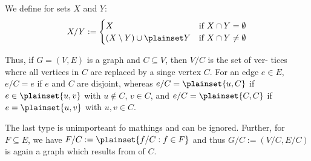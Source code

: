 We define for sets $X$ and $Y$: \[
	X/Y:= 
		\begin{cases}
			X & \text{if } X \cap Y=\emptyset \\
			(X\setminus Y) \cup \plainset Y & \text{if } X \cap Y \neq \emptyset
		\end{cases}
\]

Thus, if $G=(V,E)$ is a graph and $C\subseteq V$, then $V/C$ is the set of ver-
tices where all vertices in $C$ are replaced by a singe vertex $C$.
For an edge $e\in E$, $e/C= e$ if $e$ and $C$ are disjoint, whereas $e/C=
\plainset{u,C}$ if $e \in \plainset{u,v}$ with $u \not \in C$, $v \in C$, and
$e/C=\plainset{C,C}$ if $e = \plainset{u,v}$ with $u,v \in C$.

The last type is unimporteant fo mathings and can be ignored. Further, for 
$F \subseteq E$, we have $F/C:= \plainset{f/C: f\in F}$ and thus $G/C:=(V/C,E/C)$
is again a graph which results from  of $C$.
